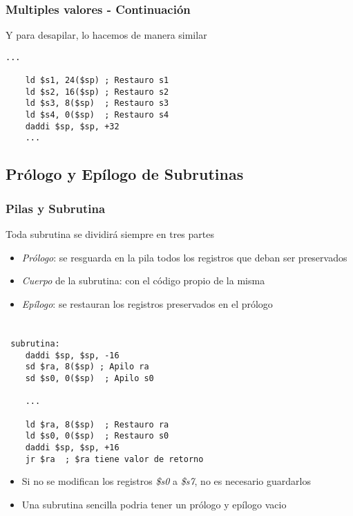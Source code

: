 \documentclass{beamer}
\begin{document}
\begin{frame}[fragile]
\frametitle{Multiples valores - Continuación}
Y para desapilar, lo hacemos de manera similar
\tiny{
\begin{block}{}
\begin{lstlisting}[language=WinMIPS64,basicstyle=\ttfamily,keywordstyle=\color{blue}]
    ...

    ld $s1, 24($sp) ; Restauro s1
    ld $s2, 16($sp) ; Restauro s2
    ld $s3, 8($sp)  ; Restauro s3
    ld $s4, 0($sp)  ; Restauro s4
    daddi $sp, $sp, +32
    ...
\end{lstlisting}
\end{block}
}
\end{frame}


\subsection{Prólogo y Epílogo de Subrutinas}

\begin{frame}
\frametitle{Pilas y Subrutina}
Toda subrutina se dividirá siempre en tres partes
\begin{itemize}
\item \emph{Prólogo}: se resguarda en la pila todos los registros que deban ser preservados
\item \emph{Cuerpo} de la subrutina: con el código propio de la misma
\item \emph{Epílogo}: se restauran los registros preservados en el prólogo
\end{itemize}
\end{frame}

\begin{frame}[fragile]
\frametitle{}
\tiny{
\begin{block}{}
\begin{lstlisting}[language=WinMIPS64,basicstyle=\ttfamily,keywordstyle=\color{blue}]

 subrutina:
    daddi $sp, $sp, -16 
    sd $ra, 8($sp) ; Apilo ra
    sd $s0, 0($sp)  ; Apilo s0
	
    ...

    ld $ra, 8($sp)  ; Restauro ra
    ld $s0, 0($sp)  ; Restauro s0
    daddi $sp, $sp, +16
    jr $ra  ; $ra tiene valor de retorno
\end{lstlisting}
\end{block}
}
\begin{itemize}
\item Si no se modifican los registros \emph{\$s0} a \emph{\$s7}, no es necesario guardarlos
\item Una subrutina sencilla podria tener un prólogo y epílogo vacio
\end{itemize}

\end{frame}
\end{document}
